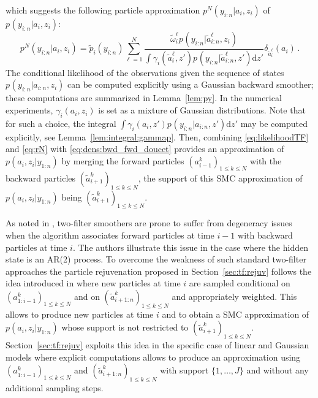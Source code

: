 \documentclass[nolayout]{article}
\theoremstyle{plain}
\theoremstyle{definition}
\newcommand{\1}{\mathbbm{1}}
\def\rmd{\mathrm{d}}
\def\eqsp{\,}
\begin{document}
which suggests the following particle approximation $p^{N}_{}(y_{i:n}|a_{i},z_{i})$ of $p_{}(y_{i:n}|a_{i},z_{i})$:
\begin{equation}
\label{eq:likelihoodTF}
p^{N}_{}(y_{i:n}|a_{i},z_{i}) = \tilde{p}_{i}(y_{i:n}) \sum_{\ell=1}^N\frac{\tilde{\omega}^{\ell}_i p_{}(y_{i:n}|\tilde{a}^{\ell}_{i:n},z_{i})}{\int \gamma^{}_{i}(\tilde{a}^{\ell}_i,z')p_{}(y_{i:n}|\tilde{a}^{\ell}_{i:n},z')\rmd z'}\delta_{\tilde{a}^{\ell}_{i}}(a_{i})\eqsp.
\end{equation}
The conditional likelihood of the observations given the sequence of states $p_{}(y_{i:n}|a_{i:n},z_{i})$ can be computed explicitly using a Gaussian backward smoother; these computations are summarized in Lemma~\ref{lem:py}.
In the numerical experiments, $\gamma^{}_i(a_i,z_i)$ is set as a mixture of Gaussian distributions. Note that for such a choice, the integral $\int \gamma^{}_{i}(a_i,z')p_{}(y_{i:n}|a_{i:n},z')\rmd z'$ may be computed explicitly, see Lemma~\ref{lem:integral:gammap}. Then, combining \eqref{eq:likelihoodTF} and \eqref{eq:rN} with \eqref{eq:dens:bwd_fwd_doucet} provides an approximation of $p(a_{i},z_{i}|y_{1:n})$ by merging the forward particles $(a^k_{i-1})_{1\le k \le N}$ with the backward particles $(\tilde{a}^k_{i+1})_{1\le k \le N}$, the support of this SMC approximation of $p(a_{i},z_{i}|y_{1:n})$ being $(\tilde{a}^k_{i+1})_{1\le k \le N}$. 

As noted in \cite[Secion~2.6]{fearnhead:wyncoll:tawn:2010}, two-filter smoothers are prone to suffer from degeneracy issues when the algorithm associates forward particles at time $i-1$ with backward particles at time $i$. The authors illustrate this issue in the case where the hidden state is an AR(2) process. To overcome the weakness of such standard two-filter approaches the particle rejuvenation proposed in Section~\ref{sec:tf:rejuv} follows the idea introduced in \cite{fearnhead:wyncoll:tawn:2010} where new particles at time $i$ are sampled conditional on $(a^k_{1:i-1})_{1\le k \le N}$ and on $(\tilde{a}^k_{i+1:n})_{1\le k \le N}$ and appropriately weighted. This allows to produce new particles at time $i$ and to obtain a SMC approximation of $p(a_{i},z_{i}|y_{1:n})$ whose support is not restricted to $(\tilde{a}^k_{i+1})_{1\le k \le N}$. Section~\ref{sec:tf:rejuv} exploits this idea in the specific case of linear and Gaussian models where explicit computations allows to produce an approximation using $(a^k_{1:i-1})_{1\le k \le N}$ and $(\tilde{a}^k_{i+1:n})_{1\le k \le N}$ with support $\{1,\ldots,J\}$ and without any additional sampling steps.
\end{document}

